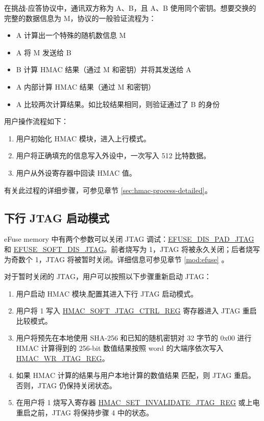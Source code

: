 \documentclass[main\_\_CN.tex]{subfiles}
\begin{document}
在挑战-应答协议中，通讯双方称为 A、B，且 A、B 使用同个密钥。想要交换的完整的数据信息为 M，协议的一般验证流程为：

\begin{itemize}
    \item A 计算出一个特殊的随机数信息 M
    \item A 将 M 发送给 B
    \item B 计算 HMAC 结果（通过 M 和密钥）并将其发送给 A
    \item A 内部计算 HMAC 结果（通过 M 和密钥）
    \item A 比较两次计算结果。如比较结果相同，则验证通过了 B 的身份
\end{itemize}

用户操作流程如下：

\begin{enumerate}
    \item 用户初始化 HMAC 模块，进入上行模式。
    \item 用户将正确填充的信息写入外设中，一次写入 512 比特数据。
    \item 用户从外设寄存器中回读 HMAC 值。
\end{enumerate}

有关此过程的详细步骤，可参见章节 \ref{sec:hmac-process-detailed}。

\subsection{下行 JTAG 启动模式}

eFuse memory 中有两个参数可以关闭 JTAG 调试：\hyperref[fielddesc:EFUSEDISPADJTAG]{EFUSE\_DIS\_PAD\_JTAG} 和 \hyperref[fielddesc:EFUSESOFTDISJTAG]{EFUSE\_SOFT\_DIS\_JTAG}。前者烧写为 1，JTAG 将被永久关闭；后者烧写为奇数个 1，JTAG 将被暂时关闭。详细信息可参见章节 \ref{mod:efuse} \textit{}。

对于暂时关闭的 JTAG，用户可以按照以下步骤重新启动 JTAG：

\begin{enumerate}
    \item 用户启动 HMAC 模块,配置其进入下行 JTAG 启动模式。
    \item 用户将 1 写入 \hyperref[regdesc:HMACSOFTJTAGCTRLREG]{HMAC\_SOFT\_JTAG\_CTRL\_REG} 寄存器进入 JTAG 重启比较模式。
    \item 用户将预先在本地使用 SHA-256 和已知的随机密钥对 32 字节的 0x{}00 进行 HMAC 计算得到的 256-bit 数值结果按照 word 的大端序依次写入 \hyperref[regdesc:HMACWRJTAGREG]{HMAC\_WR\_JTAG\_REG}。
    \item 如果 HMAC 计算的结果与用户本地计算的数值结果 匹配，则 JTAG 重启。否则，JTAG 仍保持关闭状态。
    \item 在用户将 1 烧写入寄存器 \hyperref[regdesc:HMACSETINVALIDATEJTAGREG]{HMAC\_SET\_INVALIDATE\_JTAG\_REG} 或上电重启之前，JTAG 将保持步骤 4 中的状态。
\end{enumerate}
\end{document}
